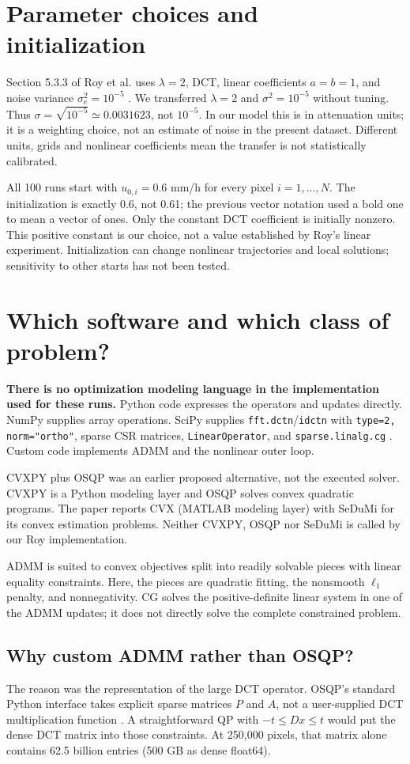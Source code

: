 \documentclass[11pt,a4paper]{article}
\begin{document}
\section{Parameter choices and initialization}
Section 5.3.3 of Roy et al. uses $\lambda=2$, DCT, linear coefficients $a=b=1$, and noise variance $\sigma_e^2=10^{-5}$ \cite{roy}. We transferred $\lambda=2$ and $\sigma^2=10^{-5}$ without tuning. Thus $\sigma=\sqrt{10^{-5}}\simeq0.0031623$, not $10^{-5}$. In our model this is in attenuation units; it is a weighting choice, not an estimate of noise in the present dataset. Different units, grids and nonlinear coefficients mean the transfer is not statistically calibrated.

All 100 runs start with $u_{0,i}=0.6$ mm/h for every pixel $i=1,\ldots,N$. The initialization is exactly 0.6, not 0.61; the previous vector notation used a bold one to mean a vector of ones. Only the constant DCT coefficient is initially nonzero. This positive constant is our choice, not a value established by Roy's linear experiment. Initialization can change nonlinear trajectories and local solutions; sensitivity to other starts has not been tested.
\clearpage
\section{Which software and which class of problem?}
\textbf{There is no optimization modeling language in the implementation used for these runs.} Python code expresses the operators and updates directly. NumPy supplies array operations. SciPy supplies \texttt{fft.dctn}/\texttt{idctn} with \texttt{type=2, norm="ortho"}, sparse CSR matrices, \texttt{LinearOperator}, and \texttt{sparse.linalg.cg} \cite{dct,cg}. Custom code implements ADMM and the nonlinear outer loop.

CVXPY plus OSQP was an earlier proposed alternative, not the executed solver. CVXPY is a Python modeling layer and OSQP solves convex quadratic programs. The paper reports CVX (MATLAB modeling layer) with SeDuMi for its convex estimation problems. Neither CVXPY, OSQP nor SeDuMi is called by our Roy implementation.

ADMM is suited to convex objectives split into readily solvable pieces with linear equality constraints. Here, the pieces are quadratic fitting, the nonsmooth $\ell_1$ penalty, and nonnegativity. CG solves the positive-definite linear system in one of the ADMM updates; it does not directly solve the complete constrained problem.
\subsection{Why custom ADMM rather than OSQP?}
The reason was the representation of the large DCT operator. OSQP's standard Python interface takes explicit sparse matrices $P$ and $A$, not a user-supplied DCT multiplication function \cite{osqp}. A straightforward QP with $-t\le Dx\le t$ would put the dense DCT matrix into those constraints. At 250,000 pixels, that matrix alone contains 62.5 billion entries (500 GB as dense float64).
\end{document}
